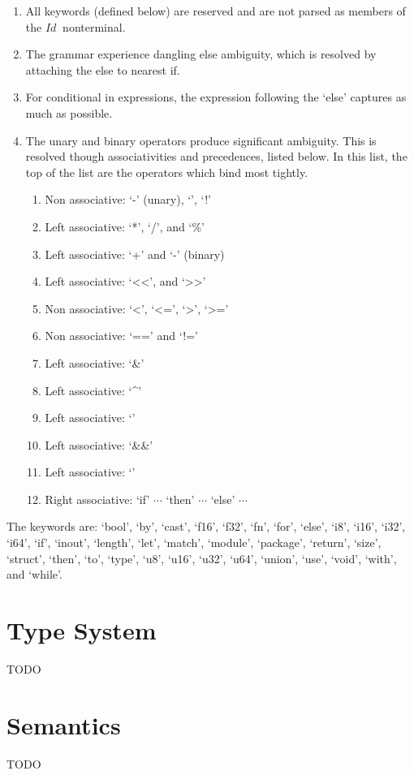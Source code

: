 \documentclass[letterpaper]{article}
\newcommand{\nonterminal}[1]{#1\ }
\begin{document}
\begin{enumerate}
  \item All keywords (defined below) are reserved and are not parsed as members of the $\nonterminal{Id}$ nonterminal.
  \item The grammar experience dangling else ambiguity, which is resolved by attaching the else to nearest if.
  \item For conditional in expressions, the expression following the `else' captures as much as possible.
  \item The unary and binary operators produce significant ambiguity.
    This is resolved though associativities and precedences, listed below.
    In this list, the top of the list are the operators which bind most tightly.
    \begin{enumerate}
      \item Non associative: `-' (unary), `\texttildelow', `!'
      \item Left associative: `*', `/', and `\%'
      \item Left associative: `+' and `-' (binary)
      \item Left associative: `\textless\textless', and `\textgreater\textgreater'
      \item Non associative: `\textless', `\textless=', `\textgreater', `\textgreater='
      \item Non associative: `==' and `!='
      \item Left associative: `\&'
      \item Left associative: `\^{}'
      \item Left associative: `\textbar'
      \item Left associative: `\&\&'
      \item Left associative: `\textbar\textbar'
      \item Right associative: `if' $\cdots$ `then' $\cdots$ `else' $\cdots$
    \end{enumerate}
\end{enumerate}
%
The keywords are: `bool', `by', `cast', `f16', `f32', `fn', `for', `else', `i8', `i16', `i32', `i64', `if', `inout', `length', `let', `match', `module', `package', `return', `size', `struct', `then', `to', `type', `u8', `u16', `u32', `u64', `union', `use', `void', `with', and `while'.

\section{Type System}\label{sec:types}
TODO

\section{Semantics}\label{sec:semantics}
TODO
\end{document}
